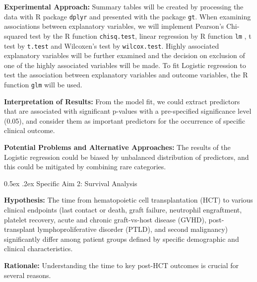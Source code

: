 \documentclass[11pt,]{article}
\makeatletter
\renewcommand\subsection{
  \@startsection{subsection}{2}{\z@}
    {-1.5ex\@plus -1ex \@minus -.2ex}%
    {0.5ex \@plus .2ex}%
    {\normalfont\normalsize\bf}} %
\makeatother
\begin{document}
\textbf{Experimental Approach:} Summary tables will be created by
processing the data with R package \texttt{dplyr} and presented with the
package \texttt{gt}. When examining associations between explanatory
variables, we will implement Pearson's Chi-squared test by the R
function \texttt{chisq.test}, linear regression by R function
\texttt{lm} , t test by \texttt{t.test} and Wilcoxen's test by
\texttt{wilcox.test}. Highly associated explanatory variables will be
further examined and the decision on exclusion of one of the highly
associated variables will be made. To fit Logistic regression to test
the association between explanatory variables and outcome variables, the
R function \texttt{glm} will be used.

\textbf{Interpretation of Results:} From the model fit, we could extract
predictors that are associated with significant p-values with a
pre-specified significance level (0.05), and consider them as important
predictors for the occurrence of specific clinical outcome.

\textbf{Potential Problems and Alternative Approaches: } The results of
the Logistic regression could be biased by unbalanced distribution of
predictors, and this could be mitigated by combining rare categories.

\hypertarget{specific-aim-2-survival-analysis}{%
\subsection{Specific Aim 2: Survival
Analysis}\label{specific-aim-2-survival-analysis}}

\textbf{Hypothesis:} The time from hematopoietic cell transplantation
(HCT) to various clinical endpoints (last contact or death, graft
failure, neutrophil engraftment, platelet recovery, acute and chronic
graft-vs-host disease (GVHD), post-transplant lymphoproliferative
disorder (PTLD), and second malignancy) significantly differ among
patient groups defined by specific demographic and clinical
characteristics.

\textbf{Rationale:} Understanding the time to key post-HCT outcomes is
crucial for several reasons.
\end{document}
